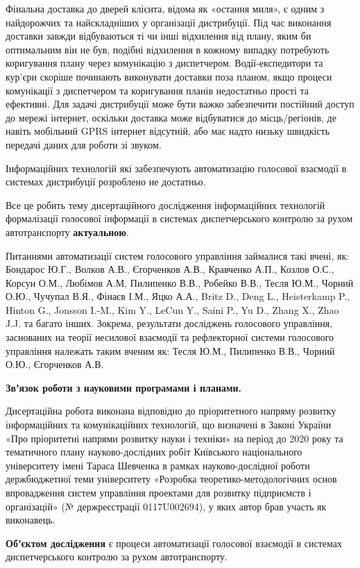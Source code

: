 Фінальна доставка до дверей клієнта, відома як «остання миля», є одним з найдорожчих та найскладніших у організації дистрибуції. Під час виконання доставки завжди відбуваються ті чи інші відхилення від плану, яким би оптимальним він не був, подібні відхилення в кожному випадку потребують коригування плану через комунікацію з диспетчером. Водії-експедитори та кур'єри скоріше починають виконувати доставки поза планом, якщо процеси комунікації з диспетчером та коригування планів недостатньо прості та ефективні. Для задачі дистрибуції може бути важко забезпечити постійний доступ до мережі інтернет, оскільки доставка може відбуватися до місць/регіонів, де навіть мобільний GPRS інтернет відсутній, або має надто низьку швидкість передачі даних для роботи зі звуком.

Інформаційних технологій які забезпечують автоматизацію голосової взаємодії в системах дистрибуції розроблено не достатньо.

Все це робить тему дисертаційного дослідження інформаційних технологій формалізації голосової інформації в системах диспетчерського контролю за рухом автотранспорту \textbf{актуальною}.

Питаннями автоматизації систем голосового управління займалися такі вчені, як: Бондарос Ю.Г., Волков А.В., Єгорченков А.В., Кравченко А.П., Козлов О.С., Корсун О.М., Любімов А.М, Пилипенко В.В., Робейко В.В., Тесля Ю.М., Чорний О.Ю., Чучупал В.Я., Фінаєв І.М., Яцко А.А., Britz D., Deng L., Heisterkamp P., Hinton G., Jonsson I.-M., Kim Y., LeCun Y., Saini P., Yu D., Zhang X., Zhao J.J. та багато інших. Зокрема, результати досліджень голосового управління, заснованих на теорії несилової взаємодії та рефлекторної системи голосового управління належать таким вченим як: Тесля Ю.М., Пилипенко В.В., Чорний О.Ю., Єгорченков А.В.

\textbf{Звʼязок роботи з науковими програмами і планами.}

Дисертаційна робота виконана відповідно до пріоритетного напряму розвитку інформаційних та комунікаційних технологій, що визначені в Законі України «Про пріоритетні напрями розвитку науки і техніки» на період до 2020 року та тематичного плану науково-дослідних робіт Київського національного університету імені Тараса Шевченка в рамках науково-дослідної роботи держбюджетної теми університету «Розробка теоретико-методологічних основ впровадження систем управління проектами для розвитку підприємств і організацій» (№ держреєстрації 0117U002694), у яких автор брав участь як виконавець.

\textbf{Обʼєктом дослідження} є процеси автоматизації голосової взаємодії в системах диспетчерського контролю за рухом автотранспорту.

